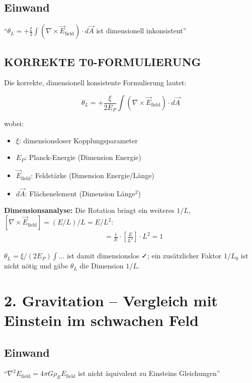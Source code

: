 	\subsection*{Einwand}
	``$\theta_L = +\frac{\xi}{2} \int (\nabla \times \vec{E}_{\text{field}}) \cdot d\vec{A}$ ist dimensionell inkonsistent''
	
	\subsection*{\textbf{KORREKTE T0-FORMULIERUNG}}
	
	Die korrekte, dimensionell konsistente Formulierung lautet:
	
	\[
	\theta_L = +\frac{\xi}{2E_P} \int (\nabla \times \vec{E}_{\text{field}}) \cdot d\vec{A}
	\]
	
	wobei:
	\begin{itemize}
		\item $\xi$: dimensionsloser Kopplungsparameter
		\item $E_P$: Planck-Energie (Dimension Energie)
		\item $\vec{E}_{\text{field}}$: Feldstärke (Dimension Energie/Länge)
		\item $d\vec{A}$: Flächenelement (Dimension Länge$^2$)
	\end{itemize}
	
	\textbf{Dimensionsanalyse:} Die Rotation bringt ein weiteres $1/L$, $[\nabla \times \vec{E}_{\text{field}}] = (E/L)/L = E/L^2$:
	\begin{align*}
		[\theta_L] &= \frac{1}{E} \cdot \left[\frac{E}{L^2}\right] \cdot L^2 = 1
	\end{align*}
	
	$\theta_L = \xi/(2E_P)\int\ldots$ ist damit dimensionslos ✓; ein zusätzlicher Faktor $1/L_0$ ist nicht nötig und gäbe $\theta_L$ die Dimension $1/L$.
	
	\section*{2. Gravitation -- Vergleich mit Einstein im schwachen Feld}
	
	\subsection*{Einwand}
	``$\nabla^2 E_{\text{field}} = 4\pi G \rho_E E_{\text{field}}$ ist nicht äquivalent zu Einsteins Gleichungen''
	
